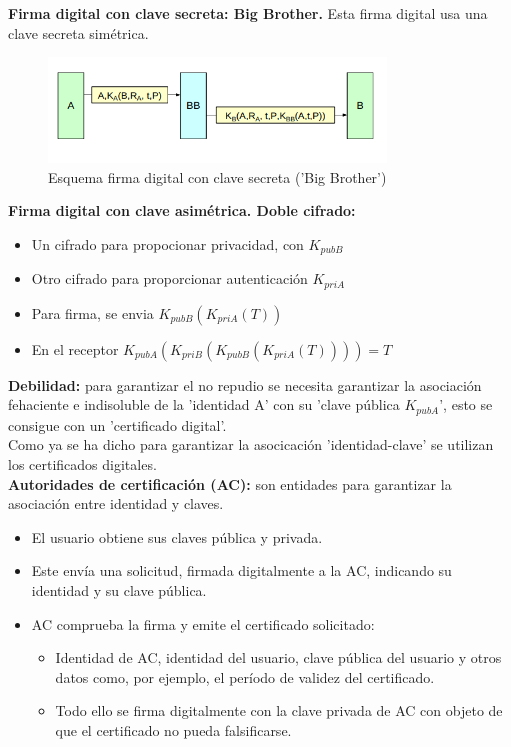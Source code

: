 \documentclass[a4paper,11pt]{article}
\begin{document}
\textbf{Firma digital con clave secreta: Big Brother.} Esta firma digital usa una clave secreta simétrica. \\

\begin{figure}[h]
\centering
\caption{Esquema firma digital con clave secreta ('Big Brother')}
\includegraphics[scale=1,width=0.8\textwidth]{firma_big_brother.png}
\end{figure}

\textbf{Firma digital con clave asimétrica. Doble cifrado:}

\begin{itemize}
\item Un cifrado para propocionar privacidad, con $K_{pubB}$
\item Otro cifrado para proporcionar autenticación $K_{priA}$
\item Para firma, se envia $K_{pubB}(K_{priA}(T))$
\item En el receptor $K_{pubA}(K_{priB}(K_{pubB}(K_{priA}(T))))=T$
\end{itemize}

\textbf{Debilidad:} para garantizar el no repudio se necesita garantizar la asociación fehaciente e indisoluble de la 'identidad A' con su 'clave pública $K_{pubA}$', esto se consigue con un 'certificado digital'. \\

Como ya se ha dicho para garantizar la asocicación 'identidad-clave' se utilizan los certificados digitales. \\

\textbf{Autoridades de certificación (AC):} son entidades para garantizar la asociación entre identidad y claves.

\begin{itemize}
\item El usuario obtiene sus claves pública y privada.
\item Este envía una solicitud, firmada digitalmente a la AC, indicando su identidad y su clave pública.
\item AC comprueba la firma y emite el certificado solicitado:
	\begin{itemize}
		\item Identidad de AC, identidad del usuario, clave pública del usuario y otros datos como, por ejemplo, el período de validez del certificado.
		\item Todo ello se firma digitalmente con la clave privada de AC con objeto de que el certificado no pueda falsificarse.
	\end{itemize}
\end{itemize}
\end{document}
